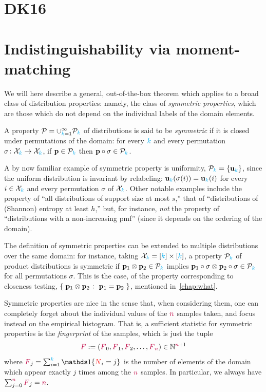 \section{DK16}

\section{Indistinguishability via moment-matching}
\label{ssec:momentmatching}
We will here describe a general, out-of-the-box theorem which applies to a broad class of distribution properties: namely, the class of \emph{symmetric properties}, which are those which do not depend on the individual labels of the domain elements.
\begin{definition}
	A property $\mathcal{P}=\cup_{{\textcolor{cyan}{k}}=1}^\infty \mathcal{P}_{\textcolor{cyan}{k}}$ of distributions is said to be \emph{symmetric} if it is closed under permutations of the domain: for every ${\textcolor{cyan}{k}}$ and every permutation $\sigma\colon\mathcal{X}_{\textcolor{cyan}{k}}\to \mathcal{X}_{\textcolor{cyan}{k}}$, if $\mathbf{p}\in\mathcal{P}_{\textcolor{cyan}{k}}$ then $\mathbf{p}\circ\sigma\in\mathcal{P}_{\textcolor{cyan}{k}}$.
\end{definition}
A by now familiar example of symmetric property is uniformity, $\mathcal{P}_{\textcolor{cyan}{k}} =\{\mathbf{u}_{ {\textcolor{cyan}{k}} } \}$, since the uniform distribution is invariant by relabeling: $\mathbf{u}_{ {\textcolor{cyan}{k}} } (\sigma(i))=\mathbf{u}_{ {\textcolor{cyan}{k}} } (i)$ for every $i\in\mathcal{X}_{\textcolor{cyan}{k}}$ and every permutation $\sigma$ of $\mathcal{X}_{\textcolor{cyan}{k}}$. Other notable examples include the property of ``all distributions of support size at most $s$,'' that of ``distributions of (Shannon) entropy at least $h$,'' but, for instance, \emph{not} the property of ``distributions with a non-increasing pmf'' (since it depends on the ordering of the domain).

The definition of symmetric properties can be extended to multiple distributions over the same domain: for instance, taking $\mathcal{X}_{\textcolor{cyan}{k}}=[{\textcolor{cyan}{k}}]\times[{\textcolor{cyan}{k}}]$, a property $\mathcal{P}_{\textcolor{cyan}{k}}$ of product distributions is symmetric if $\mathbf{p}_1\otimes \mathbf{p}_2\in \mathcal{P}_{\textcolor{cyan}{k}}$ implies $\mathbf{p}_1\circ\sigma\otimes \mathbf{p}_2\circ\sigma\in \mathcal{P}_{\textcolor{cyan}{k}}$ for all permutations $\sigma$. This is the case, \eg of the property corresponding to {closeness testing}, $\setOfSuchThat{\p_1\otimes\p_2}{\p_1=\p_2}$, mentioned in~\cref{chap:what}.

Symmetric properties are nice in the sense that, when considering them, one can completely forget about the individual values of the ${\textcolor{purple}{n}}$ samples taken, and focus instead on the empirical histogram. That is, a sufficient statistic for symmetric properties is the \emph{fingerprint} of the samples, which is just the tuple
\[
	\textcolor{purple}{F}:= (\textcolor{purple}{F}_{0},\textcolor{purple}{F}_{1},\textcolor{purple}{F}_{2},\dots,\textcolor{purple}{F}_{{\textcolor{purple}{n}}}) \in \mathbb{N}^{{\textcolor{purple}{n}}+1}
\]
where $\freq_{j} = \sum_{i=1}^\ab \indic{\occur_{i}=j}$ is the number of elements of the domain which appear exactly $j$ times among the ${\textcolor{purple}{n}}$ samples. In particular, we always have $\sum_{j=0}^{\textcolor{purple}{n}} \textcolor{purple}{F}_j = {\textcolor{purple}{n}}$.\medskip

